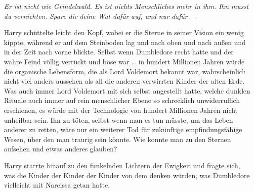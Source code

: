 \emph{Er ist nicht wie Grindelwald. Es ist nichts Menschliches mehr in ihm. Ihn musst du vernichten. Spare dir deine Wut dafür auf, und nur dafür} —

Harry schüttelte leicht den Kopf, wobei er die Sterne in seiner Vision ein wenig kippte, während er auf dem Steinboden lag und nach oben und nach außen und in der Zeit nach vorne blickte. Selbst wenn Dumbledore recht hatte und der wahre Feind völlig verrückt und böse war … in hundert Millionen Jahren würde die organische Lebensform, die als Lord Voldemort bekannt war, wahrscheinlich nicht viel anders aussehen als all die anderen verwirrten Kinder der alten Erde. Was auch immer Lord Voldemort mit sich selbst angestellt hatte, welche dunklen Rituale auch immer auf rein menschlicher Ebene so schrecklich unwiderruflich erschienen, es würde mit der Technologie von hundert Millionen Jahren nicht unheilbar sein. Ihn zu töten, selbst wenn man es tun müsste, um das Leben anderer zu retten, wäre nur ein weiterer Tod für zukünftige empfindungsfähige Wesen, über den man traurig sein könnte. Wie konnte man zu den Sternen aufsehen und etwas anderes glauben?

Harry starrte hinauf zu den funkelnden Lichtern der Ewigkeit und fragte sich, was die Kinder der Kinder der Kinder von dem denken würden, was Dumbledore vielleicht mit Narcissa getan hatte.

